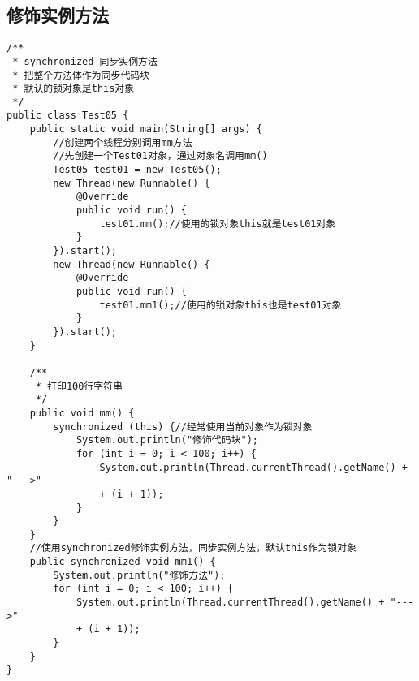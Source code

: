 \documentclass[a4paper]{report}
\begin{document}
\subsection{修饰实例方法}
\begin{Verbatim}[frame=single,numbersep=5pt,xleftmargin=1.5em,xrightmargin=1.5em]
/**
 * synchronized 同步实例方法
 * 把整个方法体作为同步代码块
 * 默认的锁对象是this对象
 */
public class Test05 {
    public static void main(String[] args) {
        //创建两个线程分别调用mm方法
        //先创建一个Test01对象，通过对象名调用mm()
        Test05 test01 = new Test05();
        new Thread(new Runnable() {
            @Override
            public void run() {
                test01.mm();//使用的锁对象this就是test01对象
            }
        }).start();
        new Thread(new Runnable() {
            @Override
            public void run() {
                test01.mm1();//使用的锁对象this也是test01对象
            }
        }).start();
    }

    /**
     * 打印100行字符串
     */
    public void mm() {
        synchronized (this) {//经常使用当前对象作为锁对象
            System.out.println("修饰代码块");
            for (int i = 0; i < 100; i++) {
                System.out.println(Thread.currentThread().getName() + "--->"
                + (i + 1));
            }
        }
    }
    //使用synchronized修饰实例方法，同步实例方法，默认this作为锁对象
    public synchronized void mm1() {
        System.out.println("修饰方法");
        for (int i = 0; i < 100; i++) {
            System.out.println(Thread.currentThread().getName() + "--->"
            + (i + 1));
        }
    }
}
\end{Verbatim}
\end{document}
